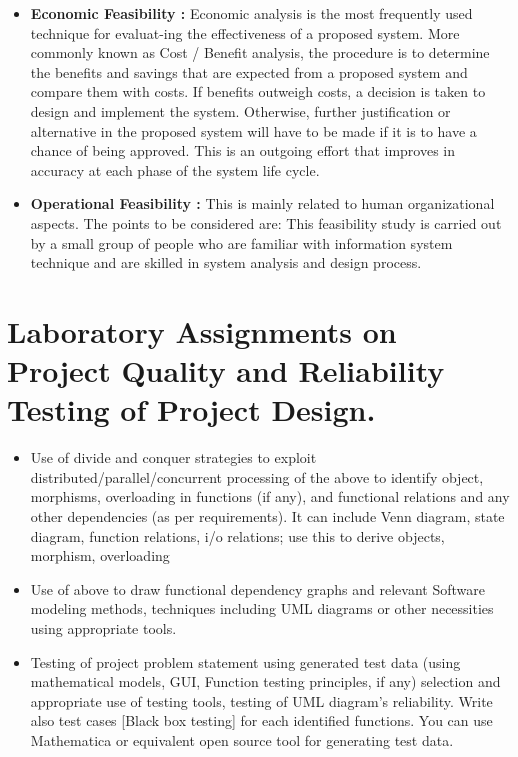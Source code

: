 \documentclass{report} %
\begin{document}
\begin{appendices}
\begin{itemize}
			\item \textbf{Economic Feasibility :} Economic analysis is the most frequently used technique for evaluat-ing the effectiveness of a proposed system. More commonly known as Cost / Benefit analysis, the procedure is to determine the benefits and savings that are expected from a proposed system and compare them
			with costs. If benefits outweigh costs, a decision is taken to design and
			implement the system. Otherwise, further justification or alternative in the proposed system will have to be made if it is to have a chance of being approved. This is an outgoing effort that improves in accuracy
			at each phase of the system life cycle.
			
			\item \textbf{Operational Feasibility :} This is mainly related to human organizational aspects. The points to be considered are: This feasibility study is carried out by a small group of people who are familiar with information system technique and are skilled in system analysis and design process.
		\end{itemize}
					
	\chapter{Laboratory Assignments on Project Quality and Reliability Testing of Project Design.}
	\pagebreak
	\vspace*{0.5cm}
		
		\begin{itemize}
			\item Use of divide and conquer strategies to exploit distributed/parallel/concurrent
			processing of the above to identify object, morphisms, overloading in functions
			(if any), and functional relations and any other dependencies (as per requirements).
			It can include Venn diagram, state diagram, function relations,
			i/o relations; use this to derive objects, morphism, overloading
			\item Use of above to draw functional dependency graphs and relevant Software
			modeling methods, techniques including UML diagrams or other necessities
			using appropriate tools.
			\item Testing of project problem statement using generated test data (using mathematical
			models, GUI, Function testing principles, if any) selection and appropriate
			use of testing tools, testing of UML diagram’s reliability. Write also test
			cases [Black box testing] for each identified functions. You can use Mathematica
			or equivalent open source tool for generating test data.
		\end{itemize}
		

\end{appendices}
\end{document}
